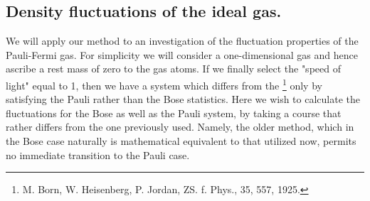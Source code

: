 \begin{paper}{1}
\section{Density fluctuations of the ideal gas.} We will apply our method to an investigation of the fluctuation properties of the Pauli-Fermi gas. For simplicity we will consider a one-dimensional gas and hence ascribe a rest mass of zero to the gas atoms. If we finally select the "speed of light" equal to 1, then we have a system which differs from the \footnote{M. Born, W. Heisenberg, P. Jordan, ZS. f. Phys., 35, 557, 1925.} only by satisfying the Pauli rather than the Bose statistics. Here we wish to calculate the fluctuations for the Bose as well as the Pauli system, by taking a course that rather differs from the one previously used. Namely, the older method, which in the Bose case naturally is mathematical equivalent to that utilized now, permits no immediate transition to the Pauli case.


\end{paper}
